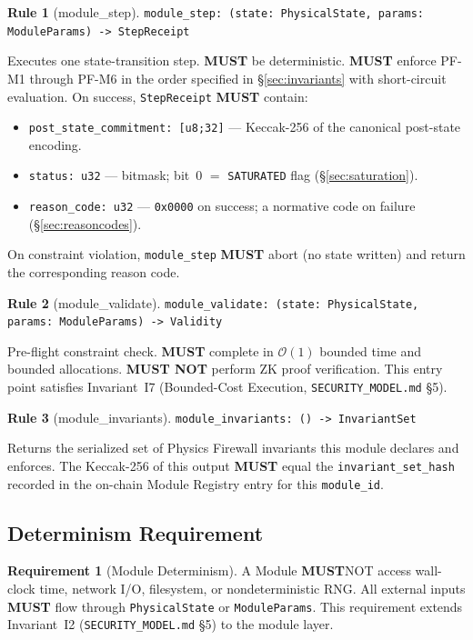 \documentclass[11pt,letterpaper]{article}
\theoremstyle{definition}
\newtheorem{specrule}{Rule}[section]
\newtheorem{requirement}{Requirement}[section]
\newcommand{\MUST}{\textbf{MUST}}
\newcommand{\MUSTNOT}{\textbf{MUST NOT}}
\begin{document}
\begin{specrule}[module\_step]
\label{rule:step}
\texttt{module\_step: (state: PhysicalState, params: ModuleParams) -> StepReceipt}

Executes one state-transition step. \MUST{} be deterministic. \MUST{} enforce PF-M1 through PF-M6 in the order specified in §\ref{sec:invariants} with short-circuit evaluation. On success, \texttt{StepReceipt} \MUST{} contain:
\begin{itemize}
    \item \texttt{post\_state\_commitment: [u8;32]} — Keccak-256 of the canonical post-state encoding.
    \item \texttt{status: u32} — bitmask; bit~0 $=$ \texttt{SATURATED} flag (§\ref{sec:saturation}).
    \item \texttt{reason\_code: u32} — \texttt{0x0000} on success; a normative code on failure (§\ref{sec:reasoncodes}).
\end{itemize}
On constraint violation, \texttt{module\_step} \MUST{} abort (no state written) and return the corresponding reason code.
\end{specrule}

\begin{specrule}[module\_validate]
\label{rule:validate}
\texttt{module\_validate: (state: PhysicalState, params: ModuleParams) -> Validity}

Pre-flight constraint check. \MUST{} complete in $\mathcal{O}(1)$ bounded time and bounded allocations. \MUSTNOT{} perform ZK proof verification. This entry point satisfies Invariant~I7 (Bounded-Cost Execution, \texttt{SECURITY\_MODEL.md} §5).
\end{specrule}

\begin{specrule}[module\_invariants]
\label{rule:invariants}
\texttt{module\_invariants: () -> InvariantSet}

Returns the serialized set of Physics Firewall invariants this module declares and enforces. The Keccak-256 of this output \MUST{} equal the \texttt{invariant\_set\_hash} recorded in the on-chain Module Registry entry for this \texttt{module\_id}.
\end{specrule}

\subsection{Determinism Requirement}
\label{sec:determinism}

\begin{requirement}[Module Determinism]
\label{req:det}
A Module \MUST NOT{} access wall-clock time, network I/O, filesystem, or nondeterministic RNG. All external inputs \MUST{} flow through \texttt{PhysicalState} or \texttt{ModuleParams}. This requirement extends Invariant~I2 (\texttt{SECURITY\_MODEL.md} §5) to the module layer.
\end{requirement}
\end{document}
